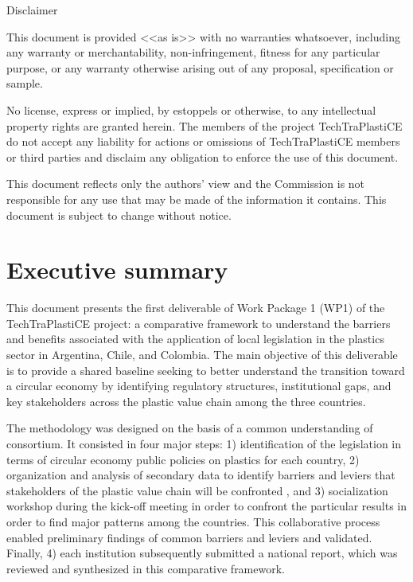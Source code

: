\documentclass[
  12pt,
  oneside]{book}
\renewcommand*\contentsname{Table of contents}
\newcommand\contentsname{Table of contents}
\begin{document}
\begin{frontmatter}
\begin{titlepage}
    {\scriptsize\centering\color{lightgray} 
    
    Disclaimer
    
    This document is provided <<as is>> with no warranties whatsoever, 
    including any warranty or merchantability, non-infringement, fitness for any particular 
    purpose, or any warranty otherwise arising out of any proposal, specification or sample.  
    
    No license, express or implied, by estoppels or otherwise, to any intellectual 
    property rights are granted herein. 
    The members of the project TechTraPlastiCE do not accept any liability for actions or 
    omissions of TechTraPlastiCE members or third parties and disclaim any obligation 
    to enforce the use of this document. 
    
    This document reflects only the authors' view and the Commission is not responsible 
    for any use that may be made of the information it contains.  
    This document is subject to change without notice. 
    
    }
    \normalsize
    
    
    
      \end{titlepage}
  \end{frontmatter}

\renewcommand*\contentsname{Contents}
{
\setcounter{tocdepth}{2}
\tableofcontents
}
\listoffigures
\listoftables

\mainmatter
\chapter*{Executive summary}\label{executive-summary}

This document presents the first deliverable of Work Package 1 (WP1) of
the TechTraPlastiCE project: a comparative framework to understand the
barriers and benefits associated with the application of local
legislation in the plastics sector in Argentina, Chile, and Colombia.
The main objective of this deliverable is to provide a shared baseline
seeking to better understand the transition toward a circular economy by
identifying regulatory structures, institutional gaps, and key
stakeholders across the plastic value chain among the three countries.

The methodology was designed on the basis of a common understanding of
consortium. It consisted in four major steps: 1) identification of the
legislation in terms of circular economy public policies on plastics for
each country, 2) organization and analysis of secondary data to identify
barriers and leviers that stakeholders of the plastic value chain will
be confronted , and 3) socialization workshop during the kick-off
meeting in order to confront the particular results in order to find
major patterns among the countries. This collaborative process enabled
preliminary findings of common barriers and leviers and validated.
Finally, 4) each institution subsequently submitted a national report,
which was reviewed and synthesized in this comparative framework.
\end{document}

